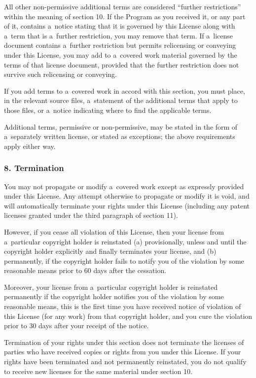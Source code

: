 \documentclass[a4paper, 11pt, twoside]{article}
\begin{document}
All other non-permissive additional terms are considered “further restrictions” within the meaning of section 10. If the Program as you received it, or any part of it, contains a~notice stating that it is governed by this License along with a~term that is a~further restriction, you may remove that term. If a~license document contains a~further restriction but permits relicensing or conveying under this License, you may add to a~covered work material governed by the terms of that license document, provided that the further restriction does not survive such relicensing or conveying.

If you add terms to a~covered work in accord with this section, you must place, in the relevant source files, a~statement of the additional terms that apply to those files, or a~notice indicating where to find the applicable terms.

Additional terms, permissive or non-permissive, may be stated in the form of a~separately written license, or stated as exceptions; the above requirements apply either way.

\subsubsection{8. Termination}

You may not propagate or modify a~covered work except as expressly provided under this License. Any attempt otherwise to propagate or modify it is void, and will automatically terminate your rights under this License (including any patent licenses granted under the third paragraph of section 11).

However, if you cease all violation of this License, then your license from a~particular copyright holder is reinstated (a) provisionally, unless and until the copyright holder explicitly and finally terminates your license, and (b) permanently, if the copyright holder fails to notify you of the violation by some reasonable means prior to 60 days after the cessation.

Moreover, your license from a~particular copyright holder is reinstated permanently if the copyright holder notifies you of the violation by some reasonable means, this is the first time you have received notice of violation of this License (for any work) from that copyright holder, and you cure the violation prior to 30 days after your receipt of the notice.

Termination of your rights under this section does not terminate the licenses of parties who have received copies or rights from you under this License. If your rights have been terminated and not permanently reinstated, you do not qualify to receive new licenses for the same material under section 10.
\end{document}
